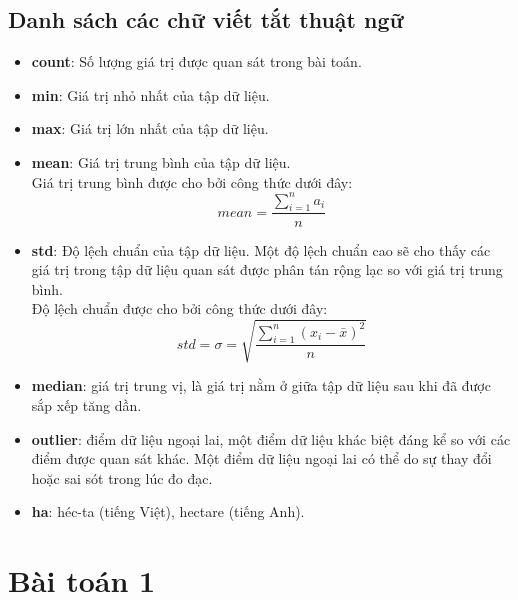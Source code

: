 \documentclass[a4paper,12pt]{report}
\begin{document}
\section*{Danh sách các chữ viết tắt thuật ngữ}
\begin{flushleft}
	\begin{itemize}
		\item \textbf{count}: Số lượng giá trị được quan sát trong bài toán.

		\item \textbf{min}: Giá trị nhỏ nhất của tập dữ liệu.

		\item \textbf{max}: Giá trị lớn nhất của tập dữ liệu.

		\item \textbf{mean}: Giá trị trung bình của tập dữ liệu.
		\\
		Giá trị trung bình được cho bởi công thức dưới đây:
		$$
		mean = \frac{{\sum\limits_{i = 1}^{n} a_{i}}}{n}
		$$

		\item \textbf{std}: Độ lệch chuẩn của tập dữ liệu. Một độ lệch chuẩn cao sẽ cho thấy các giá trị trong tập dữ liệu quan sát được phân tán rộng lạc so với giá trị trung bình.
		\\
		Độ lệch chuẩn được cho bởi công thức dưới đây:
		$$
		std = \sigma = \sqrt{\frac{\sum\limits_{i = 1}^{n} (x_{i} - \bar{x})^{2}} {n}}
		$$

		\item \textbf{median}: giá trị trung vị, là giá trị nằm ở giữa tập dữ liệu sau khi đã được sắp xếp tăng dần.

		\item \textbf{outlier}: điểm dữ liệu ngoại lai, một điểm dữ liệu khác biệt đáng kể so với các điểm được quan sát khác. Một điểm dữ liệu ngoại lai có thể do sự thay đổi hoặc sai sót trong lúc đo đạc.

		\item \textbf{ha}: héc-ta (tiếng Việt), hectare (tiếng Anh).
	\end{itemize}
\end{flushleft}

\newpage

\chapter{Bài toán 1} %
\label{cha:bài_toán_1}
\end{document}
